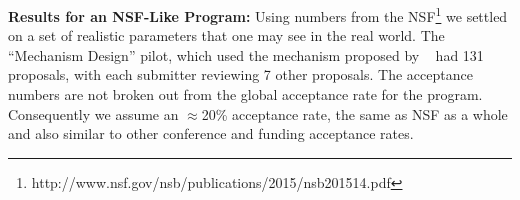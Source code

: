 \documentclass[letterpaper]{article}
\newcommand{\citet}[1]{\citeauthor{#1}~\shortcite{#1}}
\begin{document}
%

\smallskip
\noindent
\textbf{Results for an NSF-Like Program:}
Using numbers from the NSF\footnote{http://www.nsf.gov/nsb/publications/2015/nsb201514.pdf} we settled on a set of realistic parameters that one may see in the real world. The ``Mechanism Design'' pilot, which used the mechanism proposed by \citet{MeSa09a} had 131 proposals, with each submitter reviewing 7 other proposals.
The acceptance numbers are not broken out from the global acceptance rate for the program. Consequently we assume an $\approx$20\% acceptance rate, the same as NSF as a whole and also similar to other conference and funding acceptance rates.
\end{document}
